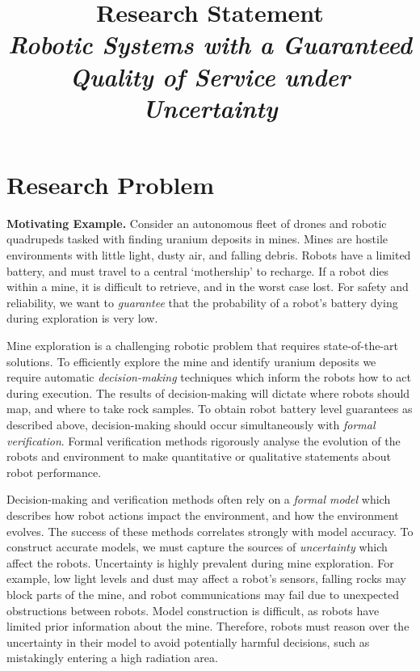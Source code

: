 \documentclass[12pt]{article}
\title{Research Statement\\ \large \emph{Robotic Systems with a Guaranteed Quality of Service under Uncertainty}}
\date{}
\author{}
\begin{document}
\maketitle
\thispagestyle{empty}

\section*{Research Problem}

\vspace*{1ex}\noindent\textbf{Motivating Example.} Consider an autonomous fleet of drones and robotic quadrupeds tasked with finding uranium deposits in mines.
%
Mines are hostile environments with little light, dusty air, and falling debris. 
%
Robots have a limited battery, and must travel to a central `mothership' to recharge.
%
If a robot dies within a mine, it is difficult to retrieve, and in the worst case lost.
%
For safety and reliability, we want to \emph{guarantee} that the probability of a robot's battery dying during exploration is very low.

Mine exploration is a challenging robotic problem that requires state-of-the-art solutions.
%
To efficiently explore the mine and identify uranium deposits we require automatic \emph{decision-making} techniques which inform the robots how to act during execution.
%
The results of decision-making will dictate where robots should map, and where to take rock samples.
%
To obtain robot battery level guarantees as described above, decision-making should occur simultaneously with \emph{formal verification}.
%
Formal verification methods rigorously analyse the evolution of the robots and environment to make quantitative or qualitative statements about robot performance.

Decision-making and verification methods often rely on a \emph{formal model} which describes how robot actions impact the environment, and how the environment evolves.
%
The success of these methods correlates strongly with model accuracy.
%
To construct accurate models, we must capture the sources of \emph{uncertainty} which affect the robots.
%
Uncertainty is highly prevalent during mine exploration.
%
For example, low light levels and dust may affect a robot's sensors, falling rocks may block parts of the mine, and robot communications may fail due to unexpected obstructions between robots.
%
Model construction is difficult, as robots have limited prior information about the mine.
%
Therefore, robots must reason over the uncertainty in their model to avoid potentially harmful decisions, such as mistakingly entering a high radiation area.
\end{document}
